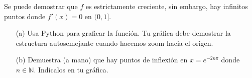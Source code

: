 \documentclass{article}
\begin{document}
Se puede demostrar que \(f\) es estrictamente creciente, sin embargo, hay infinitos puntos donde \(f'(x) = 0\) en \((0, 1]\).

\begin{itemize}
    \item[(a)] Usa Python para graficar la función. Tu gráfica debe demostrar la estructura autosemejante cuando hacemos zoom hacia el origen.
    
    \item[(b)] Demuestra (a mano) que hay puntos de inflexión en \(x = e^{-2n\pi}\) donde \(n \in \mathbb{N}\). Indícalos en tu gráfica.
\end{itemize}
\end{document}
